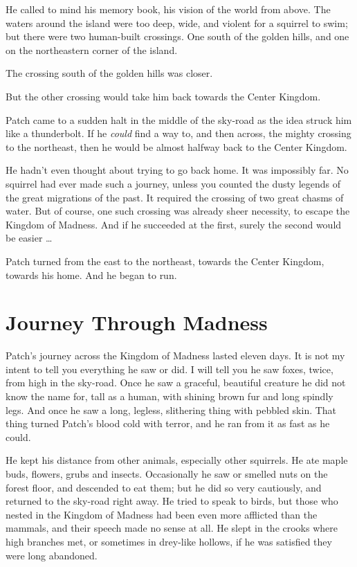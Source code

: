 \documentclass[12pt]{book}
\begin{document}
He called to mind his memory book, his vision of the world from above. The waters around the island were too deep, wide, and violent for a squirrel to swim; but there were two human-built crossings. One south of the golden hills, and one on the northeastern corner of the island.

The crossing south of the golden hills was closer.

But the other crossing would take him back towards the Center Kingdom.

Patch came to a sudden halt in the middle of the sky-road as the idea struck him like a thunderbolt. If he {\it could} find a way to, and then across, the mighty crossing to the northeast, then he would be almost halfway back to the Center Kingdom.

He hadn't even thought about trying to go back home. It was impossibly far. No squirrel had ever made such a journey, unless you counted the dusty legends of the great migrations of the past. It required the crossing of two great chasms of water. But of course, one such crossing was already sheer necessity, to escape the Kingdom of Madness. And if he succeeded at the first, surely the second would be easier \ldots{}

Patch turned from the east to the northeast, towards the Center Kingdom, towards his home. And he began to run.


\section{Journey Through Madness}

Patch's journey across the Kingdom of Madness lasted eleven days. It is not my intent to tell you everything he saw or did. I will tell you he saw foxes, twice, from high in the sky-road. Once he saw a graceful, beautiful creature he did not know the name for, tall as a human, with shining brown fur and long spindly legs. And once he saw a long, legless, slithering thing with pebbled skin. That thing turned Patch's blood cold with terror, and he ran from it as fast as he could.

He kept his distance from other animals, especially other squirrels. He ate maple buds, flowers, grubs and insects. Occasionally he saw or smelled nuts on the forest floor, and descended to eat them; but he did so very cautiously, and returned to the sky-road right away. He tried to speak to birds, but those who nested in the Kingdom of Madness had been even more afflicted than the mammals, and their speech made no sense at all. He slept in the crooks where high branches met, or sometimes in drey-like hollows, if he was satisfied they were long abandoned.
\end{document}
